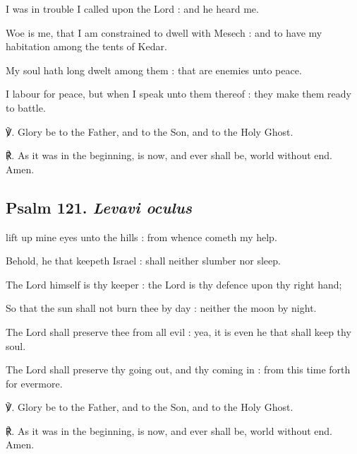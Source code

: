 \begin{multicols}{2}
 I was in trouble I called upon the Lord : and he heard me.\par
{}
Woe is me, that I am constrained to dwell with Mesech : and to have my habitation among the tents of Kedar.\par
{}My soul hath long dwelt among them : that are enemies unto peace.\par
{}I labour for peace, but when I speak unto them thereof : they make them ready to battle.\par
℣. Glory be to the Father, and to the Son, and to the Holy Ghost.\par
℟. As it was in the beginning, is now, and ever shall be, world without end. Amen.

\subsection{Psalm 121. \textit{Levavi oculus}}

 lift up mine eyes unto the hills : from whence cometh my help.\par
{}
Behold, he that keepeth Israel : shall neither slumber nor sleep.\par
{}The Lord himself is thy keeper : the Lord is thy defence upon thy right hand;\par
{}So that the sun shall not burn thee by day : neither the moon by night.\par
{}The Lord shall preserve thee from all evil : yea, it is even he that shall keep thy soul.\par
{}The Lord shall preserve thy going out, and thy coming in : from this time forth for evermore.\par
℣. Glory be to the Father, and to the Son, and to the Holy Ghost.\par
℟. As it was in the beginning, is now, and ever shall be, world without end. Amen.

\vspace{-0.55\baselineskip}


\end{multicols}
